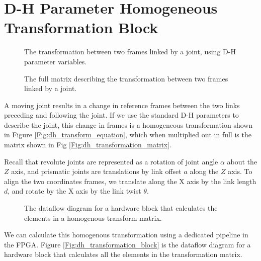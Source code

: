 \section{D-H Parameter Homogeneous Transformation Block}

\begin{figure}[ht]
\center
{}
\caption{The transformation between two frames linked by a joint, using D-H parameter variables.}
\label{fig:dh_transform_equation}
\end{figure}

\begin{figure}[ht]
\center
{}
\caption{The full matrix describing the transformation between two frames linked by a joint.}
\label{fig:dh_transform_matrix}
\end{figure}

A moving joint results in a change in reference frames between the two links preceding and following the joint. If we use the standard D-H parameters to describe the joint, this change in frames is a homogeneous transformation shown in Figure \ref{Fig:dh_transform_equation}, which when multiplied out in full is the matrix shown in Fig \ref{Fig:dh_transformation_matrix}.

Recall that revolute joints are represented as a rotation of joint angle $\alpha$ about the $Z$ axis, and prismatic joints are translations by link offset $a$ along the $Z$ axis. To align the two coordinates frames, we translate along the X axis by the link length $d$, and rotate by the X axis by the link twist $\theta$.

\begin{figure}[ht]
\center
{}
\caption{The dataflow diagram for a hardware block that calculates the elements in a homogenous transform matrix.}
\label{fig:dh_transform_block}
\end{figure}

We can calculate this homogenous transformation using a dedicated pipeline in the FPGA. Figure \ref{Fig:dh_transformation_block} is the dataflow diagram for a hardware block that calculates all the elements in the transformation matrix.